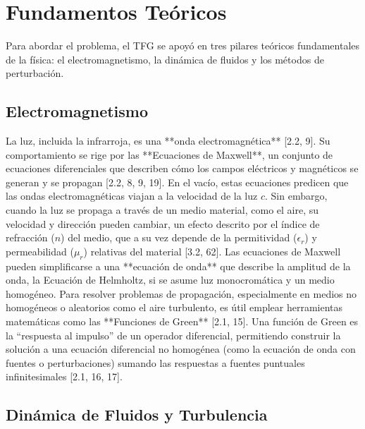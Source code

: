\section{Fundamentos Teóricos} 

Para abordar el problema, el TFG se apoyó en tres pilares teóricos fundamentales de la física: el electromagnetismo, la dinámica de fluidos y los métodos de perturbación. 

\subsection{Electromagnetismo} La luz, incluida la infrarroja, es una **onda electromagnética** [2.2, 9]. Su comportamiento se rige por las **Ecuaciones de Maxwell**, un conjunto de ecuaciones diferenciales que describen cómo los campos eléctricos y magnéticos se generan y se propagan [2.2, 8, 9, 19]. En el vacío, estas ecuaciones predicen que las ondas electromagnéticas viajan a la velocidad de la luz $c$. Sin embargo, cuando la luz se propaga a través de un medio material, como el aire, su velocidad y dirección pueden cambiar, un efecto descrito por el índice de refracción ($n$) del medio, que a su vez depende de la permitividad ($\epsilon_r$) y permeabilidad ($\mu_r$) relativas del material [3.2, 62]. Las ecuaciones de Maxwell pueden simplificarse a una **ecuación de onda** que describe la amplitud de la onda, la Ecuación de Helmholtz, si se asume luz monocromática y un medio homogéneo. Para resolver problemas de propagación, especialmente en medios no homogéneos o aleatorios como el aire turbulento, es útil emplear herramientas matemáticas como las **Funciones de Green** [2.1, 15]. Una función de Green es la ``respuesta al impulso'' de un operador diferencial, permitiendo construir la solución a una ecuación diferencial no homogénea (como la ecuación de onda con fuentes o perturbaciones) sumando las respuestas a fuentes puntuales infinitesimales [2.1, 16, 17]. 

\subsection{Dinámica de Fluidos y Turbulencia} 


